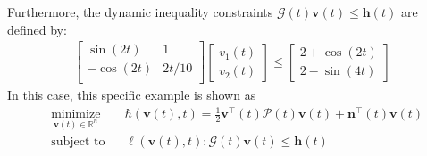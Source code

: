 \documentclass[fleqn,10pt]{wlscirep}
\begin{document}
Furthermore, the dynamic inequality constraints $\mathcal{G}(t)\bm{v}(t) \leq \bm{h}(t)$ are defined by:
\begin{equation}\label{eq:constraints}
\begin{aligned}
\begin{bmatrix}
\sin(2t) & 1 \\
-\cos(2t) & 2t/10 \\
\end{bmatrix}
\begin{bmatrix} v_1(t)  \\ v_2(t)  \end{bmatrix} \leq
\begin{bmatrix}
2 + \cos(2t) \\
2 - \sin(4t)
\end{bmatrix}
\end{aligned}
\end{equation}
In this case, this specific example is shown as
\begin{equation}
\begin{aligned}
& \underset{\bm{v}(t) \in \mathbb{R}^n}{\text{minimize}} & & \hbar(\bm{v}(t), t) = \frac{1}{2} \bm{v}^\top(t) \mathcal{P}(t) \bm{v}(t) + \bm{n}^\top(t)\bm{v}(t) \\
& \text{subject to} & & \bm{\ell}(\bm{v}(t), t):\mathcal{G}(t)\bm{v}(t) \leq \bm{h}(t)
\end{aligned}
\label{eq:problem234}
\end{equation}
\end{document}
